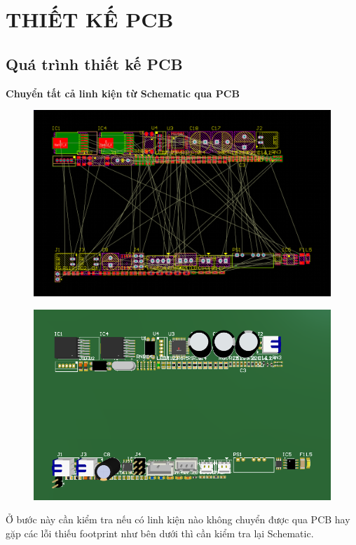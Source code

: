\chapter{THIẾT KẾ PCB}
\section{Quá trình thiết kế PCB}
\textbf{Chuyển tất cả linh kiện từ Schematic qua PCB}
\begin{figure}[H]
    \centering
    \includegraphics[width=1\textwidth]{pictures/7a.png}
\end{figure}
\begin{figure}[H]
    \centering
    \includegraphics[width=1\textwidth]{pictures/7b.png}
\end{figure}
Ở bước này cần kiểm tra nếu có linh kiện nào không chuyển được qua PCB hay gặp các lỗi thiếu footprint như bên dưới thì cần kiểm tra lại Schematic.
